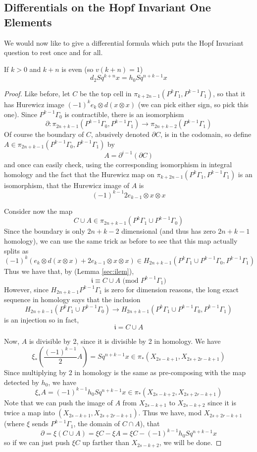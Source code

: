 \subsection{Differentials on the Hopf Invariant One Elements}

We would now like to give a differential formula which puts the Hopf Invariant question to rest once and for all.
\begin{Theorem}
  \label{sec:hdiffthm}
  If $k>0$ and $k+n$ is even (so $v(k+n)=1$)
  \[d_{2}Sq^{k+n}x = h_0Sq^{n+k-1}x\]
\end{Theorem}


\begin{proof}
  Like before, let $C$ be the top cell in $\pi_{k+2n-1}(P^k\Gamma_1,P^{k-1}\Gamma_1)$, so that it has Hurewicz image $(-1)^ke_k\otimes d(x\otimes x)$ (we can pick either sign, so pick this one).  
  Since $P^{k-1}\Gamma_0$ is contractible, there is an isomorphism 
  \[\partial : \pi_{2n+k-1}(P^{k-1}\Gamma_0,P^{k-1}\Gamma_1)\to \pi_{2n+k-2}(P^{k-1}\Gamma_1)\]
  Of course the boundary of $C$, abusively denoted $\partial C$, is in the codomain, so define $A\in \pi_{2n+k-1}(P^{k-1}\Gamma_0,P^{k-1}\Gamma_1)$ by 
  \[A=\partial^{i-1}(\partial C)\]
  and once can easily check, using the corresponding isomorphism in integral homology and the fact that the Hurewicz map on $\pi_{k+2n-1}(P^k\Gamma_1,P^{k-1}\Gamma_1)$ is an isomorphism, that the Hurewicz image of $A$ is
  \[(-1)^{k-1}2e_{k-1}\otimes x\otimes x\]
  
  Consider now the map 
  \[C\cup A \in \pi_{2n+k-1}(P^k\Gamma_1\cup P^{k-1}\Gamma_0)\]
  Since the boundary is only $2n+k-2$ dimensional (and thus has zero $2n+k-1$ homology),
  we can use the same trick as before to see that this map actually splits as 
  \[(-1)^k(e_k\otimes d(x\otimes x) + 2e_{k-1}\otimes x \otimes x)\in H_{2n+k-1}(P^k\Gamma_1\cup P^{k-1}\Gamma_0,P^{k-1}\Gamma_1)\]
  Thus we have that, by (Lemma \ref{sec:ilem}), 
  \[\mathfrak{i} \equiv C\cup A \mbox{ (mod $P^{k-1}\Gamma_1$)}\]
  However, since $H_{2n+k-1}P^{k-1}\Gamma_1$ is zero for dimension reasons, the long exact sequence in homology says that the inclusion
  \[H_{2n+k-1}(P^k\Gamma_1\cup P^{k-1}\Gamma_0)\to H_{2n+k-1}(P^k\Gamma_1\cup P^{k-1}\Gamma_0,P^{k-1}\Gamma_1)\]
  is an injection so in fact, 
  \[\mathfrak{i} = C\cup A\]
  
  Now, $A$ is divisible by 2, since it is divisible by 2 in homology.
  We have
  \[\xi_*\left(\frac{(-1)^{k-1}}{2}A\right) = Sq^{n+k-1}x \in \pi_*(X_{2s-k+1},X_{2s+2r-k+1})\]
  Since multiplying by 2 in homology is the same as pre-composing with the map detected by $h_0$, we have
  \[\xi_*A = (-1)^{k-1}h_0Sq^{n+k-1}x \in \pi_*(X_{2s-k+2},X_{2s+2r-k+1})\]
  Note that we can push the image of $A$ from $X_{2s-k+1}$ to $X_{2s-k+2}$ since it is twice a map into $(X_{2s-k+1},X_{2s+2r-k+1})$.
  Thus we have, mod $X_{2s+2r-k+1}$ (where $\xi$ sends $P^{k-1}\Gamma_1$, the domain of $C\cap A$), that
  \[\partial = \xi(C\cup A) = \xi C - \xi A = \xi C - (-1)^{k-1}h_0Sq^{n+k-1}x\]
  so if we can just push $\xi C$ up farther than $X_{2s-k+2}$, we will be done.  



\end{proof}
